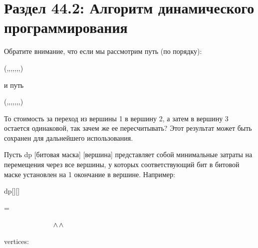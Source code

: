 \vspace{\baselineskip}
\section*{Раздел 44.2: Алгоритм динамического программирования}

\vspace{\baselineskip}
Обратите внимание, что если мы рассмотрим путь (по порядку):

\vspace{\baselineskip}
\begin{tcolorbox}
(,,,,,,,)
\end{tcolorbox}

\vspace{\baselineskip}
и путь

\vspace{\baselineskip}
\begin{tcolorbox}
(,,,,,,,)
\end{tcolorbox}

\vspace{\baselineskip}
То стоимость за переход из вершины 1 в вершину 2, а затем в вершину 3 остается одинаковой, так зачем же ее пересчитывать? Этот результат может быть сохранен для дальнейшего использования.

\vspace{\baselineskip}
Пусть dp [битовая маска] [вершина] представляет собой минимальные затраты на перемещения через все вершины, у которых соответствующий бит в битовой маске установлен на 1 окончание в вершине. Например:

\vspace{\baselineskip}
\begin{tcolorbox}
dp[][]

\hspace{0.9cm} = \hspace{0.5mm} \hspace{0mm}  
   
 \ \ \ \ \ \ \ \ \ \ \ \ \ \ $\wedge \hspace{0.5mm}\wedge$ {\color{OliveGreen}{// соответствие вершин и значения 1 в битовой маске}}

vertices: \hspace{2mm}   \hspace{0cm}   {\color{OliveGreen}{// вершины}}
\end{tcolorbox}

